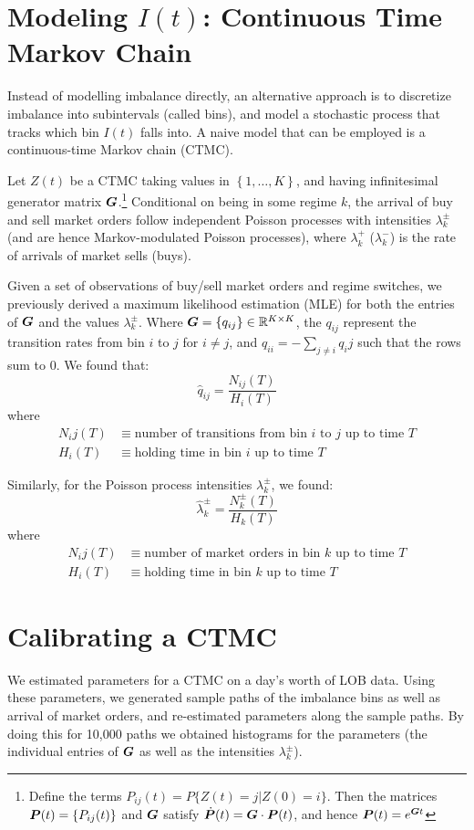 \section{Modeling \texorpdfstring{$I(t)$}{I(t)}: Continuous Time Markov Chain}
Instead of modelling imbalance directly, an alternative approach is to discretize imbalance
into subintervals (called bins), and model a stochastic process that tracks which
bin $I(t)$ falls into. A naive model that can be employed is a continuous-time Markov chain (CTMC).

Let $Z(t)$ be a CTMC taking values in $\left\lbrace 1,\dots , K \right\rbrace$, and having
infinitesimal generator matrix $\boldsymbol{G}$.\footnote{Define the terms 
$P_{ij}(t) = P \lbrace Z(t) = j | Z(0) = i \rbrace$. Then the matrices 
$\boldsymbol{P}(t) = \lbrace P_{ij}(t) \rbrace$ and $\boldsymbol{G}$ satisfy
$\dot{\boldsymbol{P}}(t) = \boldsymbol{G} \cdot \boldsymbol{P}(t)$, and hence $\boldsymbol{P}(t) = e^{\boldsymbol{G}t}$} 
Conditional on being in some regime $k$, the arrival of buy and sell market orders follow
independent Poisson processes with intensities $\lambda_k^\pm$ (and are hence Markov-modulated
Poisson processes), where $\lambda_k^+$ ($\lambda_k^-$) is the rate of arrivals of market sells (buys).

Given a set of observations of buy/sell market orders and regime switches, we previously derived a
maximum likelihood estimation (MLE) for both the entries of $\boldsymbol{G}$ and the values $\lambda_k^\pm$. 
Where $\boldsymbol{G} = \lbrace q_{ij} \rbrace \in \mathbb{R}^{K \times K}$, the $q_{ij}$ represent the
transition rates from bin $i$ to $j$ for $i \neq j$, and $q_{ii} = - \sum_{j \neq i} q_ij$ such
that the rows sum to $0$. We found that:
$$ \hat{q}_{ij} = \dfrac{N_{ij}(T)}{H_i(T)} $$
where
\begin{align*} 
N_ij(T) & \equiv \text{number of transitions from bin $i$ to $j$ up to time $T$} \\
H_i(T) & \equiv \text{holding time in bin $i$ up to time $T$}
\end{align*}

Similarly, for the Poisson process intensities $\lambda_k^\pm$, we found:
$$ \hat{\lambda}_k^\pm = \dfrac{N_k^\pm(T)}{H_k(T)} $$
where
\begin{align*} 
N_ij(T) & \equiv \text{number of market orders in bin $k$ up to time $T$} \\
H_i(T) & \equiv \text{holding time in bin $k$ up to time $T$}
\end{align*}

\section{Calibrating a CTMC}
We estimated parameters for a CTMC on a day's worth of LOB data.
Using these parameters, we generated sample paths of the imbalance bins as well as arrival of market orders,
and re-estimated parameters along the sample paths. By doing this for 10,000 paths we obtained histograms for
the parameters (the individual entries of $\boldsymbol{G}$ as well as the intensities $\lambda_k^\pm$). 

